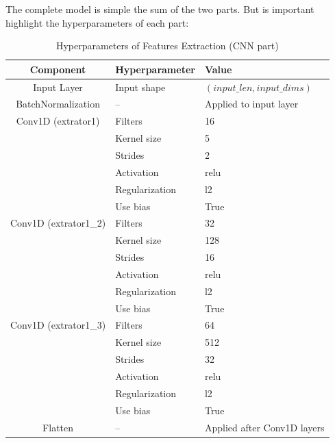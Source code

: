 \documentclass[sigconf,natbib=false]{acmart}
\begin{document}
The complete model is simple the sum of the two parts. But is important highlight the hyperparameters of each part:

\begin{table}
  \caption{Hyperparameters of Features Extraction (CNN part)}
  \label{tab:hyperparams_conv}
  \begin{tabular}{cll}
    \toprule
    Component & Hyperparameter & Value \\
    \midrule
    Input Layer & Input shape & $(input\_len, input\_dims)$ \\
    BatchNormalization & -- & Applied to input layer \\
    Conv1D (extrator1) & Filters & 16 \\
                       & Kernel size & 5 \\
                       & Strides & 2 \\
                       & Activation & relu \\
                       & Regularization & l2 \\
                       & Use bias & True \\
    Conv1D (extrator1\_2) & Filters & 32 \\
                          & Kernel size & 128 \\
                          & Strides & 16 \\
                          & Activation & relu \\
                          & Regularization & l2 \\
                          & Use bias & True \\
    Conv1D (extrator1\_3) & Filters & 64 \\
                          & Kernel size & 512 \\
                          & Strides & 32 \\
                          & Activation & relu \\
                          & Regularization & l2 \\
                          & Use bias & True \\
    Flatten & -- & Applied after Conv1D layers \\
    \bottomrule
  \end{tabular}
\end{table}
\end{document}
